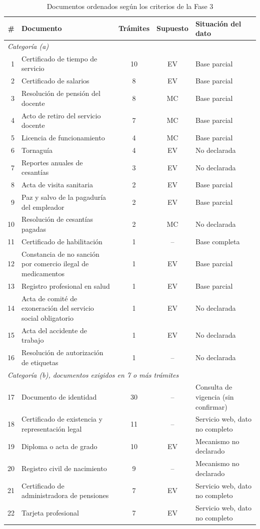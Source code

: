 \begin{table}[htbp]
\centering
\caption{Documentos ordenados según los criterios de la Fase 3}
\label{tab:candidatos}
\small
\begin{tabular}{rp{5.6cm}ccp{4.2cm}}
\hline
\# & Documento & Trámites & Supuesto & Situación del dato \\
\hline
\multicolumn{5}{l}{\textit{Categoría (a)}} \\
1 & Certificado de tiempo de servicio & 10 & EV & Base parcial \\
2 & Certificado de salarios & 8 & EV & Base parcial \\
3 & Resolución de pensión del docente & 8 & MC & Base parcial \\
4 & Acto de retiro del servicio docente & 7 & MC & Base parcial \\
5 & Licencia de funcionamiento & 4 & MC & Base parcial \\
6 & Tornaguía & 4 & EV & No declarada \\
7 & Reportes anuales de cesantías & 3 & EV & No declarada \\
8 & Acta de visita sanitaria & 2 & EV & Base parcial \\
9 & Paz y salvo de la pagaduría del empleador & 2 & EV & Base parcial \\
10 & Resolución de cesantías pagadas & 2 & MC & No declarada \\
11 & Certificado de habilitación & 1 & -- & Base completa \\
12 & Constancia de no sanción por comercio ilegal de medicamentos & 1 & EV & Base parcial \\
13 & Registro profesional en salud & 1 & EV & Base parcial \\
14 & Acta de comité de exoneración del servicio social obligatorio & 1 & EV & No declarada \\
15 & Acta del accidente de trabajo & 1 & EV & No declarada \\
16 & Resolución de autorización de etiquetas & 1 & -- & No declarada \\
\multicolumn{5}{l}{\textit{Categoría (b), documentos exigidos en 7 o más trámites}} \\
17 & Documento de identidad & 30 & -- & Consulta de vigencia (sin confirmar) \\
18 & Certificado de existencia y representación legal & 11 & -- & Servicio web, dato no completo \\
19 & Diploma o acta de grado & 10 & EV & Mecanismo no declarado \\
20 & Registro civil de nacimiento & 9 & -- & Mecanismo no declarado \\
21 & Certificado de administradora de pensiones & 7 & EV & Servicio web, dato no completo \\
22 & Tarjeta profesional & 7 & EV & Servicio web, dato no completo \\
\hline
\end{tabular}


\end{table}
